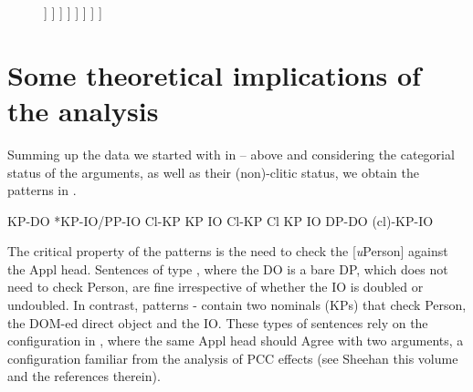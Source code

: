 \documentclass[output=paper,colorlinks,citecolor=brown,nonflat]{./langscibook}
\begin{document}
\begin{figure}%
	\begin{forest}
		[PersP
			[Pers
			]
			[\textit{v}P
				[KP\textsubscript{Theme}
				]
				[\textit{v}P
					[DP\textsubscript{Agent}
					]
					[\textit{v}'
						[\textit{v}
						]
						[V\textsubscript{Appl}P
								[KP\textsubscript{Theme}
								]
								[V'\textsubscript{Appl}
									[V\textsubscript{Appl}
									]
									[VP
										[KP\textsubscript{Goal}
										]
									]
								]
						]
						]
					]
				]
			]
		]
	\end{forest}
	\caption{\label{fig:cornilescu:13} \missingcaption}
\end{figure}


\section{Some theoretical implications of the analysis}\label{sec:cornilescu:6} %

Summing up the data we started with in  –  above and considering the categorial status of the arguments, as well as their (non)-clitic status, we obtain the patterns in . 

\ea%
   \label{ex:cornilescu:35}
   \ea KP-DO \hspace{1cm} *KP-IO/PP-IO \label{ex:cornilescu:35a}
   \ex Cl-KP \hspace{1cm} KP IO \label{ex:cornilescu:35b}
   \ex Cl-KP \hspace{1cm} Cl KP IO \label{ex:cornilescu:35c}
    \label{ex:cornilescu:35d}
   \ex DP-DO \hspace{1cm} (cl)-KP-IO \label{ex:cornilescu:35e}
   \z
   \z

The critical property of the patterns is the need to check the [\textit{u}Person] against the Appl head. Sentences of type , where the DO is a bare DP, which does not need to check Person, are fine irrespective of whether the IO is doubled or undoubled. In contrast, patterns - contain two nominals (KPs) that check Person, the DOM-ed direct object and the IO. These types of sentences rely on the configuration in , where the same Appl head should Agree with two arguments, a configuration familiar from the analysis of PCC effects (see Sheehan this volume and the references therein). 
\end{document}
